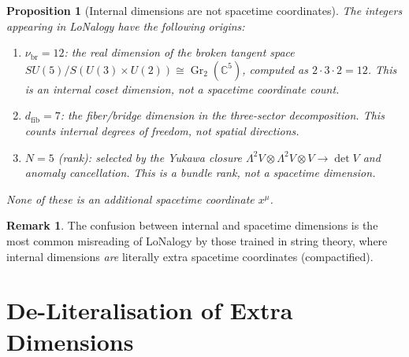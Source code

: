 \documentclass[12pt]{article}
\theoremstyle{plain}
\newtheorem{proposition}[theorem]{Proposition}
\theoremstyle{definition}
\newtheorem{remark}[theorem]{Remark}
\numberwithin{equation}{section}
\newcommand{\C}{\mathbb{C}}
\newcommand{\br}{\mathrm{br}}
\DeclareMathOperator{\Gr}{Gr}
\begin{document}
\begin{proposition}[Internal dimensions are not spacetime coordinates]\label{prop:internal}
The integers appearing in LoNalogy have the following origins:
\begin{enumerate}[label=(\roman*)]
\item $\nu_{\br}=12$: the real dimension of the broken tangent space
$SU(5)/S(U(3)\times U(2))\cong\Gr_2(\C^5)$, computed as
$2\cdot 3\cdot 2=12$.  This is an \emph{internal coset dimension},
not a spacetime coordinate count.

\item $d_{\mathrm{fib}}=7$: the fiber/bridge dimension in the
three-sector decomposition.  This counts internal degrees of
freedom, not spatial directions.

\item $N=5$ (rank): selected by the Yukawa closure
$\Lambda^2 V\otimes\Lambda^2 V\otimes V\to\det V$ and anomaly
cancellation.  This is a \emph{bundle rank}, not a spacetime
dimension.
\end{enumerate}
None of these is an additional spacetime coordinate $x^\mu$.
\end{proposition}

\begin{remark}
The confusion between internal and spacetime dimensions is the
most common misreading of LoNalogy by those trained in string
theory, where internal dimensions \emph{are} literally extra
spacetime coordinates (compactified).
\end{remark}


\section{De-Literalisation of Extra Dimensions}\label{sec:delit}
\end{document}
